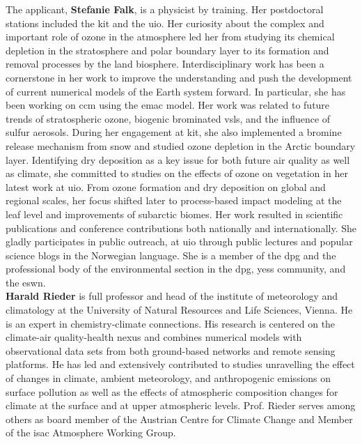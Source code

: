 The applicant, \textbf{Stefanie Falk}, is a physicist by training. Her postdoctoral stations included the \gls{kit} and the \gls{uio}. Her curiosity about the complex and important role of ozone in the atmosphere led her from studying its chemical depletion in the stratosphere and polar boundary layer to its formation and removal processes by the land biosphere. Interdisciplinary work has been a cornerstone in her work to improve the understanding and push the development of current numerical models of the Earth system forward. In particular, she has been working on \gls{ccm} using the \gls{emac} model. Her work was related to future trends of stratospheric ozone, biogenic brominated \gls{vsls}, and the influence of sulfur aerosols. During her engagement at \gls{kit}, she also implemented a bromine release mechanism from snow and studied ozone depletion in the Arctic boundary layer. Identifying dry deposition as a key issue for both future air quality as well as climate, she committed to studies on the effects of ozone on vegetation in her latest work at \gls{uio}. From ozone formation and dry deposition on global and regional scales, her focus shifted later to process-based impact modeling at the leaf level and improvements of subarctic biomes. Her work resulted in scientific publications and conference contributions both nationally and internationally. She gladly participates in public outreach, at \gls{uio} through public lectures and popular science blogs in the Norwegian language. She is a member of the \gls{dpg} and the professional body of the environmental section in the \gls{dpg}, \gls{yess} community, and the \gls{eswn}.\\

\textbf{Harald Rieder} is full professor and head of the institute of meteorology and climatology at the University of Natural Resources and Life Sciences, Vienna. He is an expert in chemistry-climate connections. His research is centered on the climate-air quality-health nexus and combines numerical models with observational data sets from both ground-based networks and remote sensing platforms. He has led and extensively contributed to studies unravelling the effect of changes in climate, ambient meteorology, and anthropogenic emissions on surface pollution as well as the effects of atmospheric composition changes for climate at the surface and at upper atmospheric levels. Prof. Rieder serves among others as board member of the Austrian Centre for Climate Change and Member of the \gls{isac} Atmosphere Working Group.

